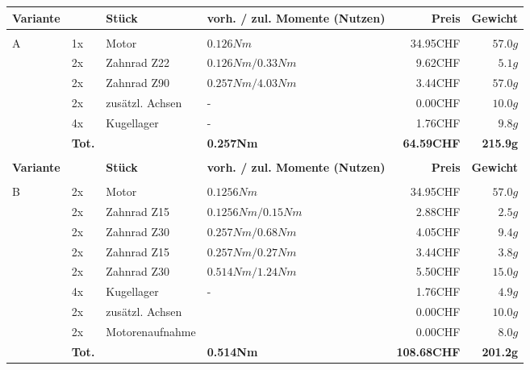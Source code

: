     \begin{longtable}{p{0.5cm}p{0.8cm}lp{3cm}rr}
        \textbf{Variante}& & \textbf{Stück} & \textbf{vorh. / zul. Momente (Nutzen)} & \textbf{Preis} & \textbf{Gewicht} \\\hline
          &       &                 &                      &          &  \\
        \multirow{6}[2]{*}{A}
          & 1x    & Motor           & $0.126 Nm$           & 34.95CHF & $57.0 g$ \\
          & 2x    & Zahnrad Z22     & $0.126 Nm / 0.33 Nm$ &  9.62CHF & $5.1 g$  \\
          & 2x    & Zahnrad Z90     & $0.257 Nm / 4.03 Nm$ &  3.44CHF & $57.0 g$ \\
          & 2x    & zusätzl. Achsen & -                    &  0.00CHF & $10.0 g$ \\
          & 4x    & Kugellager      & -                    &  1.76CHF & $9.8 g$  \\
          & \textbf{Tot.} &  & \textbf{0.257Nm} & \textbf{64.59CHF} & \textbf{215.9g} \\
          &       &                 &                      &          &  \\
          \newpage
          \textbf{Variante}& & \textbf{Stück} & \textbf{vorh. / zul. Momente (Nutzen)} & \textbf{Preis} & \textbf{Gewicht} \\\hline
          &       &                 &                      &          &  \\
        \multirow{8}[2]{*}{B}
          & 2x    & Motor           & $0.1256 Nm$          & 34.95CHF & $57.0 g$ \\
          & 2x    & Zahnrad Z15     & $0.1256 Nm / 0.15 Nm$& 2.88CHF  & $2.5 g$  \\
          & 2x    & Zahnrad Z30     & $0.257 Nm / 0.68 Nm$ & 4.05CHF  & $9.4 g$  \\
          & 2x    & Zahnrad Z15     & $0.257 Nm / 0.27 Nm$ & 3.44CHF  & $3.8 g$  \\
          & 2x    & Zahnrad Z30     & $0.514 Nm / 1.24 Nm$ & 5.50CHF  & $15.0 g$ \\
          & 4x    & Kugellager      & -                    & 1.76CHF  & $4.9 g$  \\
          & 2x    & zusätzl. Achsen &                      & 0.00CHF  & $10.0 g$ \\
          & 2x    & Motorenaufnahme &                      & 0.00CHF  & $8.0 g$  \\
          & \textbf{Tot.} &       & \textbf{0.514Nm} & \textbf{108.68CHF} & \textbf{201.2g} \\

\end{longtable}

